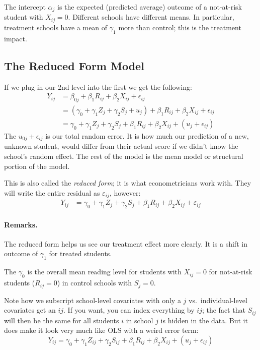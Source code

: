 \documentclass[
  letterpaper,
  DIV=11,
  numbers=noendperiod]{scrreprt}
\let\oldparagraph\paragraph
\renewcommand{\paragraph}[1]{\oldparagraph{#1}\mbox{}}
\begin{document}
The intercept \(\alpha_{j}\) is the expected (predicted average) outcome
of a not-at-risk student with \(X_{ij} = 0\). Different schools have
different means. In particular, treatment schools have a mean of
\(\gamma_1\) more than control; this is the treatment impact.

\subsection{The Reduced Form Model}\label{the-reduced-form-model}

If we plug in our 2nd level into the first we get the following:
\[\begin{aligned}
Y_{ij} &= \beta_{0j} + \beta_{1} R_{ij} + \beta_{2} X_{ij} + \epsilon_{ij} \\
&= (\gamma_{0} + \gamma_{1} Z_{j} + \gamma_{2} S_{j} + u_{j}) + \beta_1 R_{ij} + \beta_{2} X_{ij} + \epsilon_{ij} \\
&= \gamma_{0} + \gamma_{1} Z_{j} + \gamma_{2} S_{j} + \beta_{1} R_{ij} + \beta_{2} X_{ij} + (u_{j} + \epsilon_{ij})
\end{aligned}\] The \(u_{0j} + \epsilon_{ij}\) is our total random
error. It is how much our prediction of a new, unknown student, would
differ from their actual score if we didn't know the school's random
effect. The rest of the model is the mean model or structural portion of
the model.

This is also called the \emph{reduced form}; it is what econometricians
work with. They will write the entire residual as \(\varepsilon_{ij}\),
however: \[\begin{aligned}
Y_{ij} &= \gamma_{0} + \gamma_{1} Z_{j} + \gamma_{2} S_{j} + \beta_{1} R_{ij} + \beta_{2} X_{ij} + \varepsilon_{ij}
\end{aligned}\]

\paragraph{Remarks.}\label{remarks.-1}

The reduced form helps us see our treatment effect more clearly. It is a
shift in outcome of \(\gamma_1\) for treated students.

The \(\gamma_{0}\) is the overall mean reading level for students with
\(X_{ij}=0\) for not-at-risk students (\(R_{ij}=0\)) in control schools
with \(S_j = 0\).

Note how we subscript school-level covariates with only a \(j\)
vs.~individual-level covariates get an \(ij\). If you want, you can
index everything by \(ij\); the fact that \(S_{ij}\) will then be the
same for all students \(i\) in school \(j\) is hidden in the data. But
it does make it look very much like OLS with a weird error term: \[
Y_{ij} = \gamma_{0} + \gamma_{1} Z_{ij} + \gamma_{2} S_{ij} + \beta_{1} R_{ij} + \beta_{2} X_{ij} + (u_{j} + \epsilon_{ij})
\]
\end{document}
